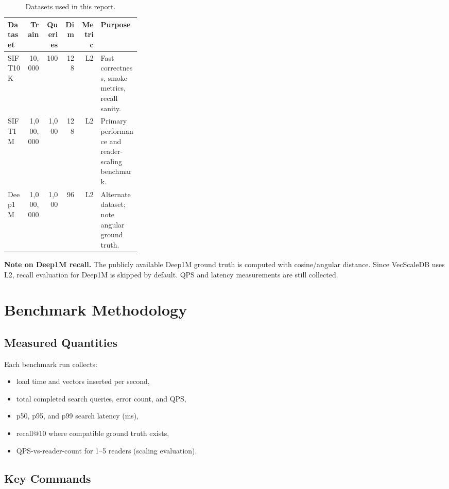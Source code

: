 \documentclass[11pt,a4paper]{article}
\begin{document}
\begin{table}[H]
\centering
\caption{Datasets used in this report.}
\renewcommand{\arraystretch}{1.2}
\begin{tabular}{lrrrrp{0.30\linewidth}}
\toprule
\textbf{Dataset} & \textbf{Train} & \textbf{Queries} & \textbf{Dim} &
\textbf{Metric} & \textbf{Purpose} \\
\midrule
SIFT10K  & 10,000    & 100   & 128 & L2 &
  Fast correctness, smoke metrics, recall sanity. \\
SIFT1M   & 1,000,000 & 1,000 & 128 & L2 &
  Primary performance and reader-scaling benchmark. \\
Deep1M   & 1,000,000 & 1,000 & 96  & L2 &
  Alternate dataset; note angular ground truth. \\
\bottomrule
\end{tabular}
\end{table}

\begin{infobox}
\textbf{Note on Deep1M recall.} The publicly available Deep1M ground truth is
computed with cosine/angular distance. Since VecScaleDB uses L2, recall
evaluation for Deep1M is skipped by default. QPS and latency measurements are
still collected.
\end{infobox}

\section{Benchmark Methodology}

\subsection{Measured Quantities}

Each benchmark run collects:
\begin{itemize}[noitemsep,topsep=4pt]
  \item load time and vectors inserted per second,
  \item total completed search queries, error count, and QPS,
  \item p50, p95, and p99 search latency (ms),
  \item recall@10 where compatible ground truth exists,
  \item QPS-vs-reader-count for 1–5 readers (scaling evaluation).
\end{itemize}

\subsection{Key Commands}
\end{document}

